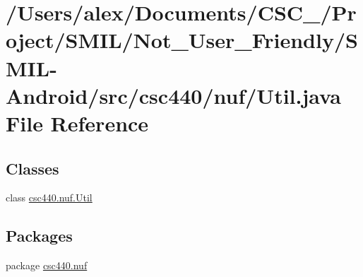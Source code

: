 \hypertarget{_s_m_i_l-_android_2src_2csc440_2nuf_2_util_8java}{\section{/\-Users/alex/\-Documents/\-C\-S\-C\-\_/\-Project/\-S\-M\-I\-L/\-Not\-\_\-\-User\-\_\-\-Friendly/\-S\-M\-I\-L-\/\-Android/src/csc440/nuf/\-Util.java File Reference}
\label{_s_m_i_l-_android_2src_2csc440_2nuf_2_util_8java}
}
\subsection*{Classes}
\begin{DoxyCompactItemize}
\item 
class \hyperlink{classcsc440_1_1nuf_1_1_util}{csc440.\-nuf.\-Util}
\end{DoxyCompactItemize}
\subsection*{Packages}
\begin{DoxyCompactItemize}
\item 
package \hyperlink{namespacecsc440_1_1nuf}{csc440.\-nuf}
\end{DoxyCompactItemize}
